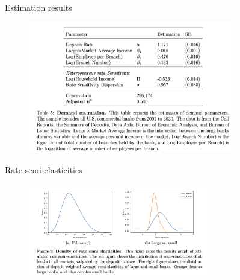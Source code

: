 \documentclass[notes,10pt, aspectratio=169]{beamer}
\newenvironment{wideitemize}{\itemize\addtolength{\itemsep}{10pt}}{\enditemize}
\begin{document}
\begin{frame}{Estimation results}

    \begin{figure}
    \centering
    \includegraphics[width=0.81\textwidth]{imgs/tab5_foot.png}
    \end{figure}
\end{frame}





\begin{frame}{Rate semi-elasticities}

        \begin{figure}
            \centering
            \includegraphics[width=0.7\textwidth]{imgs/fig9_foot.png}
        \end{figure}
        
    \end{frame}
    
\end{document}
